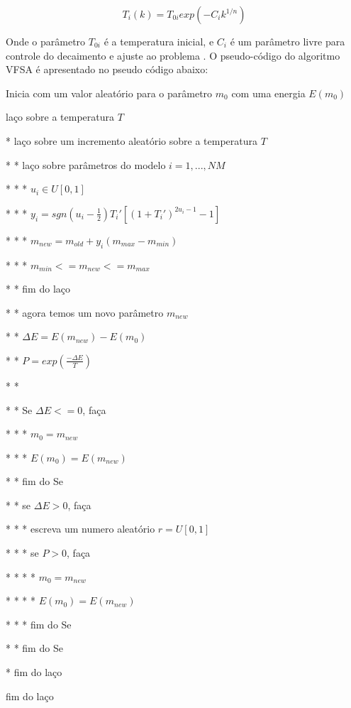\begin{equation}
\label{eq:2.16}
 T_i(k)=T_{0i}exp(-C_ik^{1/n})
\end{equation}

Onde o parâmetro $T_{0i}$ é a temperatura inicial, e $C_i$ é um parâmetro livre para controle do decaimento e ajuste ao
problema \cite{klaus}. O pseudo-código do algoritmo VFSA \cite{stoffa} é apresentado no pseudo código abaixo:

\vspace{\onelineskip} 

Inicia com um valor aleatório para o parâmetro $m_0$ com uma energia $E(m_0)$

laço sobre a temperatura $T$

* laço sobre um incremento aleatório sobre a temperatura $T$

* * laço sobre parâmetros do modelo $i=1,...,NM$

* * * $u_i \in U[0,1]$

* * * $y_i=sgn(u_i-\frac{1}{2})T_i'[(1+T_i')^{2u_i-1}-1]$

* * * $m_{new}=m_{old}+y_i(m_{max}-m_{min})$

* * * $m_{min}<=m_{new}<=m_{max}$

* * fim do laço

* * agora temos um novo parâmetro $m_{new}$

* * $\Delta E=E(m_{new})-E(m_0)$

* * $P=exp(\frac{-\Delta E}{T})$

* *

* * Se $\Delta E <= 0$, faça

* * * $m_0=m_{new}$

* * * $E(m_0)=E(m_{new})$

* * fim do Se

* * se $\Delta E > 0$, faça

* * * escreva um numero aleatório $r=U[0,1]$

* * * se $P > 0$, faça

* * * * $m_0=m_{new}$

* * * * $E(m_0)=E(m_{new})$

* * * fim do Se

* * fim do Se

* fim do laço

fim do laço

\vspace{\onelineskip} 

